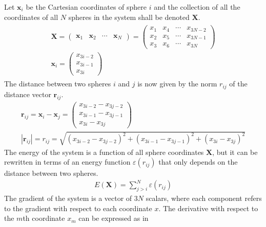 Let $\mathbf{x}_i$ be the Cartesian coordinates of sphere $i$ and the
collection of all the coordinates of all $N$ spheres in the system shall be
denoted $\mathbf{X}$.
%
\begin{align}
    \begin{aligned}
        \mathbf{X}=
        \begin{pmatrix}
            \mathbf{x}_1 & \mathbf{x}_2 & \cdots & \mathbf{x}_N
        \end{pmatrix}=
        \begin{pmatrix}
            x_1 & x_4 & \cdots & x_{3N-2}\\
            x_2 & x_5 & \cdots & x_{3N-1}\\
            x_3 & x_6 & \cdots & x_{3N}
        \end{pmatrix}\\
            \mathbf{x}_i = 
            \begin{pmatrix}
                x_{3i-2}\\
                x_{3i-1}\\
                x_{3i}
            \end{pmatrix}
    \end{aligned}
\end{align}%
%
The distance between two spheres $i$ and $j$ is now given by the norm $r_{ij}$
of the distance vector $\mathbf{r}_{ij}$. %
%
\begin{align}
    \mathbf{r}_{ij}=\mathbf{x}_i-\mathbf{x}_j=
    \begin{pmatrix}
        x_{3i-2} - x_{3j-2}\\
        x_{3i-1} - x_{3j-1}\\
        x_{3i} - x_{3j}
    \end{pmatrix}\label{eq:distancevector}\\
    |\mathbf{r}_{ij}|=r_{ij}=\sqrt{(x_{3i-2} - x_{3j-2})^2 + (x_{3i-1} - x_{3j-1})^2 + (x_{3i} - x_{3j})^2}\label{eq:distance}
\end{align}
%
The energy of the system is a function of all sphere coordinates $\mathbf{X}$,
but it can be rewritten in terms of an energy function $\varepsilon(r_{ij})$ that only depends on the
distance between two spheres. %
%
\begin{align}
    E(\mathbf{X})=\sum_{j>i}^N\varepsilon(r_{ij})
\end{align}%
%
The gradient of the system is a vector of $3N$ scalars, where each component
refers to the gradient with respect to each coordinate $x$. The derivative with
respect to the $m$th coordinate $x_m$ can be expressed as in
